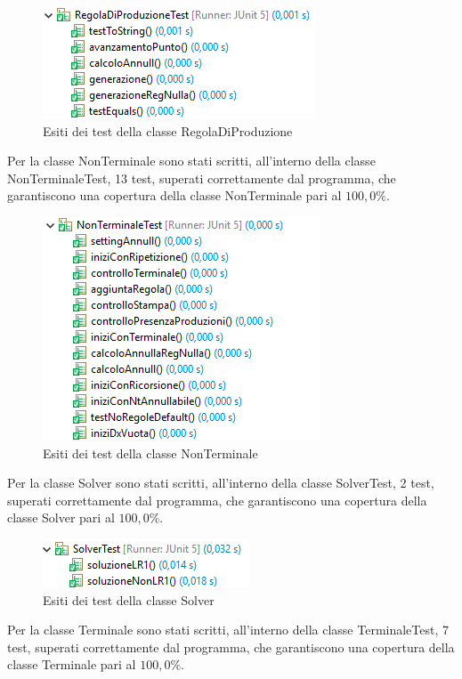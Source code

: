 \documentclass[12pt]{article}
\newcounter{subsubsubsection}[subsubsection]
\begin{document}
\begin{figure}[h]
\centering
\includegraphics[scale=0.9]{immagini/V1esitiRegolaDiProduzioneTest.png}
\caption{Esiti dei test della classe RegolaDiProduzione}
\end{figure}
Per la classe NonTerminale sono stati scritti, all'interno della classe NonTerminaleTest, 13 test, superati correttamente dal programma, che garantiscono una copertura della classe NonTerminale pari al $100,0\%$.
\begin{figure}[h]
\centering
\includegraphics[scale=0.9]{immagini/V1esitiNonTerminaleTest.png}
\caption{Esiti dei test della classe NonTerminale}
\end{figure}
\pagebreak
{}
Per la classe Solver sono stati scritti, all'interno della classe SolverTest, 2 test, superati correttamente dal programma, che garantiscono una copertura della classe Solver pari al $100,0\%$.
\begin{figure}[h]
\centering
\includegraphics[scale=0.9]{immagini/V1esitiSolverTest.png}
\caption{Esiti dei test della classe Solver}
\end{figure}
Per la classe Terminale sono stati scritti, all'interno della classe TerminaleTest, 7 test, superati correttamente dal programma, che garantiscono una copertura della classe Terminale pari al $100,0\%$.
\end{document}

